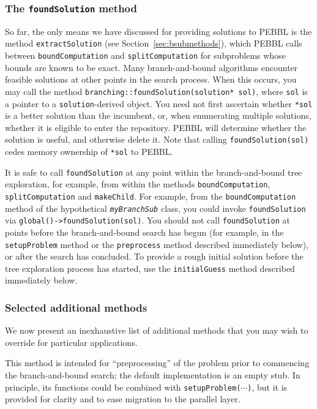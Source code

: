 \subsubsection{The \texttt{foundSolution} method}
So far, the only means we have discussed for providing solutions to
PEBBL is the method \texttt{extractSolution} (see
Section~\ref{sec:bsubmethods}), which PEBBL calls between
\texttt{boundComputation} and \texttt{splitComputation} for
subproblems whose bounds are known to be exact.  Many branch-and-bound
algorithms encounter feasible solutions at other points in the search
process.  When this occurs, you may call the method
\texttt{branching::foundSolution(solution* sol)}, where \texttt{sol}
is a pointer to a \texttt{solution}-derived object.  You need not
first ascertain whether \texttt{*sol} is a better solution than the
incumbent, or, when enumerating multiple solutions, whether it is
eligible to enter the repository.  PEBBL will determine whether the
solution is useful, and otherwise delete it.  Note that calling
\texttt{foundSolution(sol)} cedes memory ownership of \texttt{*sol}
to PEBBL.

It is safe to call \texttt{foundSolution} at any point within the
branch-and-bound tree exploration, for example, from within the
methods \texttt{boundComputation}, \texttt{splitComputation} and
\texttt{makeChild}.  For example, from the \texttt{boundComputation}
method of the hypothetical \texttt{\emph{myBranchSub}} class, you
could invoke \texttt{foundSolution} via
\texttt{global()->foundSolution(sol)}.  You should not call
\texttt{foundSolution} at points before the branch-and-bound search
has begun (for example, in the \texttt{setupProblem} method or the
\texttt{preprocess} method described immediately below), or after the
search has concluded.  To provide a rough initial solution before the
tree exploration process has started, use the \texttt{initialGuess}
method described immediately below.


\subsubsection{Selected additional methods}
\label{sec:seradd}
We now present an inexhaustive list of additional methods that you may
wish to override for particular applications.

This method is intended for ``preprocessing'' of the problem prior to
commencing the branch-and-bound search; the default implementation is
an empty stub.  In principle, its functions
could be combined with \texttt{setupProblem($\cdots$)}, but it is
provided for clarity and to ease migration to the parallel layer.

